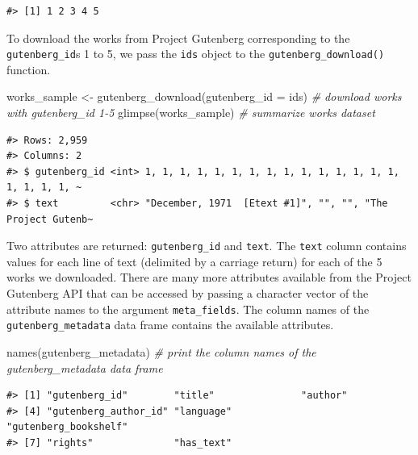 \documentclass[
  letterpaper,
]{scrbook}
\newenvironment{Shaded}{\begin{snugshade}}{\end{snugshade}}
\newcommand{\AttributeTok}[1]{\textcolor[rgb]{0.00,0.00,0.00}{#1}}
\newcommand{\CommentTok}[1]{\textcolor[rgb]{0.00,0.00,0.00}{\textit{#1}}}
\newcommand{\FunctionTok}[1]{\textcolor[rgb]{0.00,0.00,0.00}{#1}}
\newcommand{\NormalTok}[1]{\textcolor[rgb]{0.00,0.00,0.00}{#1}}
\newcommand{\OtherTok}[1]{\textcolor[rgb]{0.00,0.00,0.00}{#1}}
\begin{document}
\begin{verbatim}
#> [1] 1 2 3 4 5
\end{verbatim}

To download the works from Project Gutenberg corresponding to the
\texttt{gutenberg\_id}s 1 to 5, we pass the \texttt{ids} object to the
\texttt{gutenberg\_download()} function.

\begin{Shaded}
\begin{Highlighting}[]
\NormalTok{works\_sample }\OtherTok{\textless{}{-}} \FunctionTok{gutenberg\_download}\NormalTok{(}\AttributeTok{gutenberg\_id =}\NormalTok{ ids) }\CommentTok{\# download works with \textasciigrave{}gutenberg\_id\textasciigrave{} 1{-}5}
\FunctionTok{glimpse}\NormalTok{(works\_sample) }\CommentTok{\# summarize \textasciigrave{}works\textasciigrave{} dataset}
\end{Highlighting}
\end{Shaded}

\begin{verbatim}
#> Rows: 2,959
#> Columns: 2
#> $ gutenberg_id <int> 1, 1, 1, 1, 1, 1, 1, 1, 1, 1, 1, 1, 1, 1, 1, 1, 1, 1, 1, ~
#> $ text         <chr> "December, 1971  [Etext #1]", "", "", "The Project Gutenb~
\end{verbatim}

Two attributes are returned: \texttt{gutenberg\_id} and \texttt{text}.
The \texttt{text} column contains values for each line of text
(delimited by a carriage return) for each of the 5 works we downloaded.
There are many more attributes available from the Project Gutenberg API
that can be accessed by passing a character vector of the attribute
names to the argument \texttt{meta\_fields}. The column names of the
\texttt{gutenberg\_metadata} data frame contains the available
attributes.

\begin{Shaded}
\begin{Highlighting}[]
\FunctionTok{names}\NormalTok{(gutenberg\_metadata) }\CommentTok{\# print the column names of the \textasciigrave{}gutenberg\_metadata\textasciigrave{} data frame}
\end{Highlighting}
\end{Shaded}

\begin{verbatim}
#> [1] "gutenberg_id"        "title"               "author"             
#> [4] "gutenberg_author_id" "language"            "gutenberg_bookshelf"
#> [7] "rights"              "has_text"
\end{verbatim}
\end{document}
